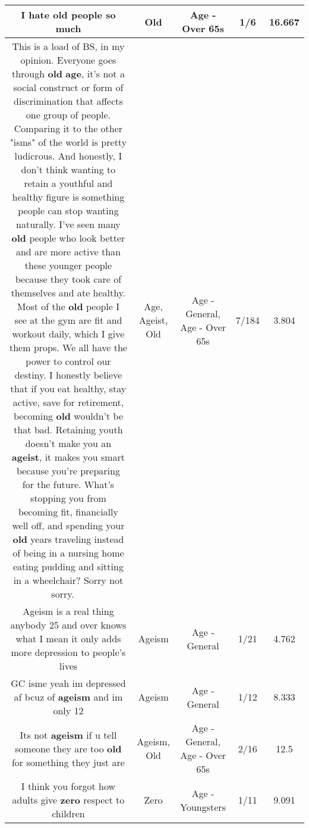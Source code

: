 \documentclass[11pt]{article}
\newlength\mylength
\begin{document}
\begin{center}
\begin{longtable}{|C{.65\mylength}|C{.30\mylength}|C{.12\mylength}|C{.12\mylength}|C{.12\mylength}|}
  \small I hate \textbf{old} people so much\normalsize   & Old & Age - Over 65s & 1/6 & 16.667 \\  \hline
  \small This is a load of BS, in my opinion. Everyone goes through \textbf{old} \textbf{age}, it's not a social construct or form of discrimination that affects one group of people. Comparing it to the other "isms" of the world is pretty ludicrous. And honestly, I don't think wanting to retain a youthful and healthy figure is something people can stop wanting naturally.  I've seen many \textbf{old} people who look better and are more active than these younger people because they took care of themselves and ate healthy. Most of the \textbf{old} people I see at the gym are fit and workout daily, which I give them props. We all have the power to control our destiny. I honestly believe that if you eat healthy,  stay active, save for retirement, becoming \textbf{old} wouldn't be that bad. Retaining youth  doesn't make you an \textbf{ageist}, it makes you smart because you're preparing for the future. What's stopping you from becoming  fit, financially well off, and spending your \textbf{old} years traveling instead of being in a nursing home eating pudding and sitting in a wheelchair? Sorry not sorry. 🤷🏾‍♀️\normalsize   & Age, Ageist, Old & Age - General, Age - Over 65s & 7/184 & 3.804 \\  \hline
  \small Ageism is a real thing anybody 25 and over knows what I mean it only adds more depression to people's lives\normalsize   & Ageism & Age - General & 1/21 & 4.762 \\  \hline
  \small GC isme yeah im depressed af bcuz of \textbf{ageism} and im only 12\normalsize   & Ageism & Age - General & 1/12 & 8.333 \\  \hline
  \small Its not \textbf{ageism} if u tell someone they are too \textbf{old} for something they just are\normalsize   & Ageism, Old & Age - General, Age - Over 65s & 2/16 & 12.5 \\  \hline
  \small I think you forgot how adults give \textbf{zero} respect to children\normalsize   & Zero & Age - Youngsters & 1/11 & 9.091 \\  \hline

\end{longtable}
\end{center}
\end{document}
